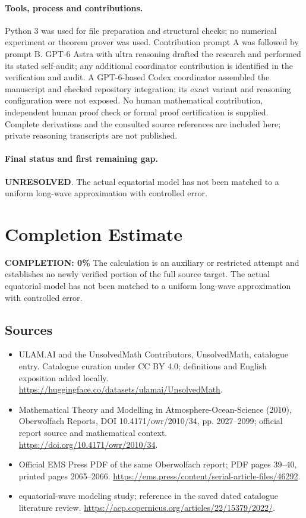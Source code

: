 \documentclass[11pt]{article}
\begin{document}
\paragraph{Tools, process and contributions.}
Python 3 was used for file preparation and structural checks; no numerical experiment or theorem prover was used. Contribution prompt A was followed by prompt B. GPT-6 Astra with ultra reasoning drafted the research and performed its stated self-audit; any additional coordinator contribution is identified in the verification and audit. A GPT-6-based Codex coordinator assembled the manuscript and checked repository integration; its exact variant and reasoning configuration were not exposed. No human mathematical contribution, independent human proof check or formal proof certification is supplied. Complete derivations and the consulted source references are included here; private reasoning transcripts are not published.

\paragraph{Final status and first remaining gap.}
\textbf{UNRESOLVED}. The actual equatorial model has not been matched to a uniform long-wave approximation with controlled error.

\section{Completion Estimate}
\noindent\textbf{COMPLETION: 0\%}
The calculation is an auxiliary or restricted attempt and establishes no newly verified portion of the full source target. The actual equatorial model has not been matched to a uniform long-wave approximation with controlled error.

\subsection{Sources}
\begin{itemize}
\item[\hypertarget{source:statement:1}{S1}] ULAM.AI and the UnsolvedMath Contributors, UnsolvedMath, catalogue entry. Catalogue curation under CC BY 4.0; definitions and English exposition added locally.
\url{https://huggingface.co/datasets/ulamai/UnsolvedMath}.
\item[\hypertarget{source:statement:2}{S2}] Mathematical Theory and Modelling in Atmosphere-Ocean-Science (2010), Oberwolfach Reports, DOI 10.4171/owr/2010/34, pp. 2027--2099; official report source and mathematical context.
\url{https://doi.org/10.4171/owr/2010/34}.
\item[\hypertarget{source:statement:3}{S3}] Official EMS Press PDF of the same Oberwolfach report; PDF pages 39--40, printed pages 2065--2066.
\url{https://ems.press/content/serial-article-files/46292}.
\item[\hypertarget{source:statement:4}{S4}] equatorial-wave modeling study; reference in the saved dated catalogue literature review.
\url{https://acp.copernicus.org/articles/22/15379/2022/}.
\end{itemize}
\label{end:statement}
\end{document}
